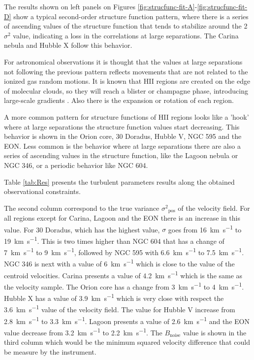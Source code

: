 \documentclass[fleqn,usenatbib, useAMS, a4paper]{mnras}
\newcommand\pos{\ensuremath{_{\mathrm{pos}}}}
\begin{document}
The results shown on left panels on Figures \ref{fig:strucfunc-fit-A}-\ref{fig:strucfunc-fit-D} show a typical second-order structure function pattern, where there is a series of ascending values of  the structure function that tends to stabilize around the 2\(\sigma^2\) value, indicating a loss in the correlations at large separations. 
The Carina nebula and Hubble X follow this behavior.

For astronomical observations it is thought that the values at large separations not following the previous pattern reflects movements that are not related to the ionized gas random motions.
It is known that HII regions are created on the edge of molecular clouds, so they will reach a blister or champagne phase, introducing large-scale gradients \citep{Mivi1995}. 
Also there is the expansion or rotation of each region.

A more common pattern for structure functions of HII regions looks like a 'hook' where at large separations the structure function values start decreasing.
This behavior is shown in the Orion core, 30 Doradus, Hubble V, NGC 595 and the EON.
Less common is the behavior where at large separations there are also a series of ascending values in the structure function, like the Lagoon nebula or NGC 346, or a periodic behavior like NGC 604.

Table \ref{tab:Res} presents the turbulent parameters results along the obtained observational constraints.

The second column correspond to the true variance \(\sigma^2\pos\) of the velocity field.
For all regions except for Carina, Lagoon and the EON there is an increase in this value.
For 30 Doradus, which has the highest value, \(\sigma\) goes from \SI{16}{km.s^{-1}} to  \SI{19}{km.s^{-1}}.
This is two times higher than NGC 604 that has a change of \SI{7}{km.s^{-1}} to \SI{9}{km.s^{-1}}, followed by NGC 595 with \SI{6.6}{km.s^{-1}} to \SI{7.5}{km.s^{-1}}.
NGC 346 is next with a value of \SI{6}{km.s^{-1}} which is close to the value of the centroid velocities.
Carina presents a value of \SI{4.2}{km.s^{-1}} which is the same as the velocity sample.
The Orion core has a change from \SI{3}{km.s^{-1}} to \SI{4}{km.s^{-1}}.
Hubble X has a value of \SI{3.9}{km.s^{-1}} which is very close with respect the \SI{3.6}{km.s^{-1}} value of the velocity field.
The value for Hubble V increase from \SI{2.8}{km.s^{-1}} to \SI{3.3}{km.s^{-1}}.
Lagoon presents a value of \SI{2.6}{km.s^{-1}} and the EON value decrease from \SI{3.2}{km.s^{-1}} to \SI{2.2}{km.s^{-1}}.
The \(B_{\text{noise}}\) value is shown in the third column which would be the minimum squared velocity difference that could be measure by the instrument.
\end{document}
